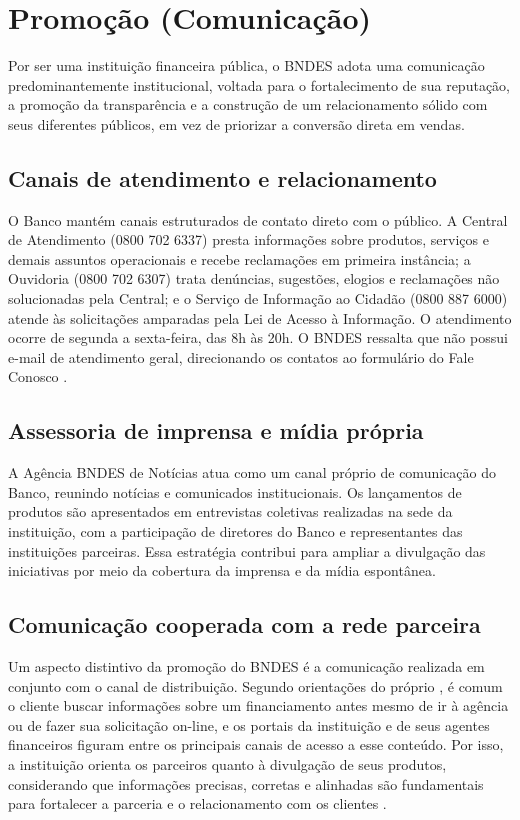 \section{Promoção (Comunicação)}

Por ser uma instituição financeira pública, o BNDES adota uma comunicação predominantemente institucional, voltada para o fortalecimento de sua reputação, a promoção da transparência e a construção de um relacionamento sólido com seus diferentes públicos, em vez de priorizar a conversão direta em vendas.

\subsection{Canais de atendimento e relacionamento}

O Banco mantém canais estruturados de contato direto com o público. A Central de Atendimento (0800 702 6337) presta informações sobre produtos, serviços e demais assuntos operacionais e recebe reclamações em primeira instância; a Ouvidoria (0800 702 6307) trata denúncias, sugestões, elogios e reclamações não solucionadas pela Central; e o Serviço de Informação ao Cidadão (0800 887 6000) atende às solicitações amparadas pela Lei de Acesso à Informação. O atendimento ocorre de segunda a sexta-feira, das 8h às 20h. O BNDES ressalta que não possui e-mail de atendimento geral, direcionando os contatos ao formulário do Fale Conosco \cite{bndes_canais_atendimento_2026}.

\subsection{Assessoria de imprensa e mídia própria}

A Agência BNDES de Notícias atua como um canal próprio de comunicação do Banco, reunindo notícias e comunicados institucionais. Os lançamentos de produtos são apresentados em entrevistas coletivas realizadas na sede da instituição, com a participação de diretores do Banco e representantes das instituições parceiras. Essa estratégia contribui para ampliar a divulgação das iniciativas por meio da cobertura da imprensa e da mídia espontânea.

\subsection{Comunicação cooperada com a rede parceira}

Um aspecto distintivo da promoção do BNDES é a comunicação realizada em conjunto com o canal de distribuição. Segundo orientações do próprio , é comum o cliente buscar informações sobre um financiamento antes mesmo de ir à agência ou de fazer sua solicitação on-line, e os portais da instituição e de seus agentes financeiros figuram entre os principais canais de acesso a esse conteúdo. Por isso, a instituição orienta os parceiros quanto à divulgação de seus produtos, considerando que informações precisas, corretas e alinhadas são fundamentais para fortalecer a parceria e o relacionamento com os clientes \cite{bndes_orientacoes_divulgacao_2026}.

